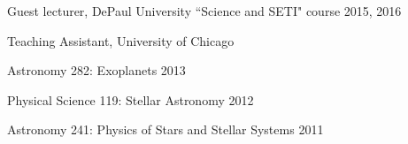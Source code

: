 \documentclass[12pt,letterpaper]{article}
\begin{document}
\begin{compactitem}[]
\item Guest lecturer, DePaul University ``Science and SETI" course \hfill2015, 2016
\item Teaching Assistant, University of Chicago
	\begin{compactitem}
	\item Astronomy 282:  Exoplanets \hfill 2013
	\item Physical Science 119:  Stellar Astronomy	\hfill 2012
	\item Astronomy 241:  Physics of Stars and Stellar Systems \hfill	2011 
	\end{compactitem}
\end{compactitem}







\vspace{7mm}
\end{document}
